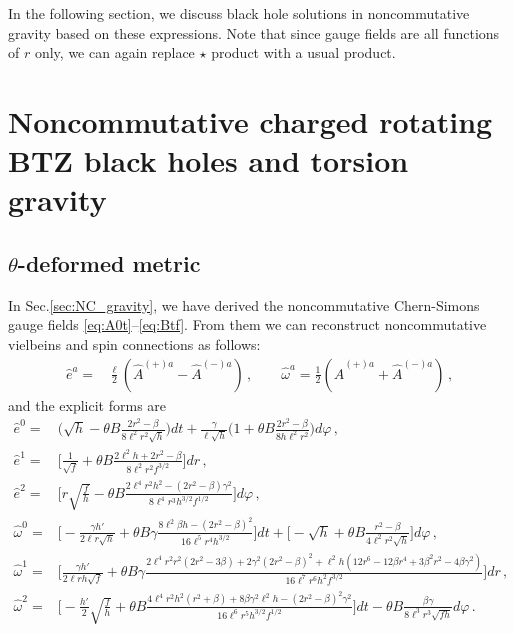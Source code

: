 \documentclass[11pt]{article}
\newcommand{\vap}{\varphi}
\numberwithin{equation}{section}
\begin{document}
In the following section, we discuss black hole solutions in
noncommutative gravity based on these expressions.
Note that since gauge fields are all functions of $r$ only,
we can again replace $\star$ product with a usual product.


\section{Noncommutative charged rotating BTZ black holes and torsion
  gravity }
\label{sec:nonc-charg-rotat}

\subsection{$\theta$-deformed metric}
\label{sec:nonc-metr}

In Sec.\ref{sec:NC_gravity}, we have derived the noncommutative
Chern-Simons gauge fields \eqref{eq:A0t}--\eqref{eq:Btf}.
From them we can reconstruct noncommutative vielbeins and
spin connections as follows:
\begin{align}
  \hat{e}^a =& \frac{\ell}{2} (\hat{A}^{(+)a} -  \hat{A}^{(-)a}  ) \,,
\qquad
  \hat{\omega}^a = \frac{1}{2} (\hat{A}^{(+)a} +  \hat{A}^{(-)a}  ) \,,
\end{align}
and the explicit forms are
\begin{align}
  \hat{e}^0 =& \bigg( \sqrt{h} - \theta B \frac{2r^2-\beta}{8\ell^2 r^2 \sqrt{h}}\bigg) dt
+\frac{\gamma}{\ell \sqrt{ h}} \bigg(1  + \theta B \frac{2r^2-\beta}{8h \ell^2 r^2} \bigg) d\varphi 
\label{eq:e0_def}\,,\\
\hat{e}^1=&  \bigg[ \frac{1}{\sqrt{f}} 
+\theta B \frac{2\ell^2 h +2r^2-\beta}{8 \ell^2 r^2 {f}^{3/2}} \bigg] dr \,,\\
\hat{e}^2=&  \bigg[ r \sqrt{\frac{f}{h}}  
- \theta B  \frac{2\ell^4 r^2 h^2  - (2r^2-\beta)\gamma^2}{8 \ell^4 r^3 h^{3/2} {f}^{1/2}}
  \bigg] d\varphi \,,\\
  \hat{\omega}^0=&
\bigg[ 
-\frac{\gamma h'}{2\ell r \sqrt{h}}
+\theta B \gamma \frac{8\ell^2 \beta h - (2r^2-\beta)^2}{16 \ell^5 r^4 h^{3/2}}
\bigg]dt
+\bigg[
-\sqrt{h}+\theta B \frac{r^2-\beta}{4 \ell^2 r^2 \sqrt{h}}
\bigg] d\vap \,,\\
  \hat{\omega}^1=&
\bigg[
\frac{\gamma h'}{2\ell r h \sqrt{f}}
+\theta B \gamma \frac{2\ell^4 r^2 r^2 (2r^2-3\beta)+2\gamma^2(2r^2-\beta)^2 + \ell^2 h (12r^6-12 \beta r^4+3\beta^2 r^2-4\beta \gamma^2)}{16 \ell^7 r^6 h^2 {f}^{3/2}}
\bigg]dr \,,\\
  \hat{\omega}^2=&
\bigg[ -\frac{h'}{2}\sqrt{\frac{f}{h}}
+\theta B \frac{4\ell^4 r^2 h^2 (r^2+\beta)+8 \beta \gamma^2 \ell^2 h -(2r^2-\beta)^2 \gamma^2}{16 \ell^6 r^5 h^{3/2} f^{1/2}}
\bigg] dt
 - \theta B \frac{\beta \gamma}{8\ell^3 r^3 \sqrt{fh}}  d\vap \,.
\label{eq:w2_def}
\end{align}
\end{document}
